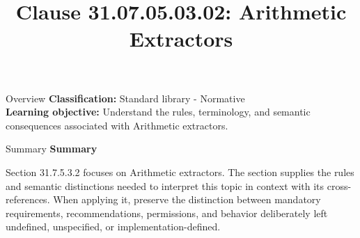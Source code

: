 \documentclass[10pt,letterpaper]{article}
\title{Clause 31.07.05.03.02: Arithmetic Extractors}
\author{}
\date{}
\begin{document}
\maketitle
\begin{CornellOverviewBox}{Overview}
\textbf{Classification:} Standard library - Normative\\[2pt]
\textbf{Learning objective:} Understand the rules, terminology, and semantic consequences associated with Arithmetic extractors.
\end{CornellOverviewBox}\begin{CornellSummaryBox}{Summary}
{\sffamily\bfseries\color{Accent} Summary}\par\vspace{3pt}Section 31.7.5.3.2 focuses on Arithmetic extractors. The section supplies the rules and semantic distinctions needed to interpret this topic in context with its cross-references. When applying it, preserve the distinction between mandatory requirements, recommendations, permissions, and behavior deliberately left undefined, unspecified, or implementation-defined.
\end{CornellSummaryBox}
\end{document}

